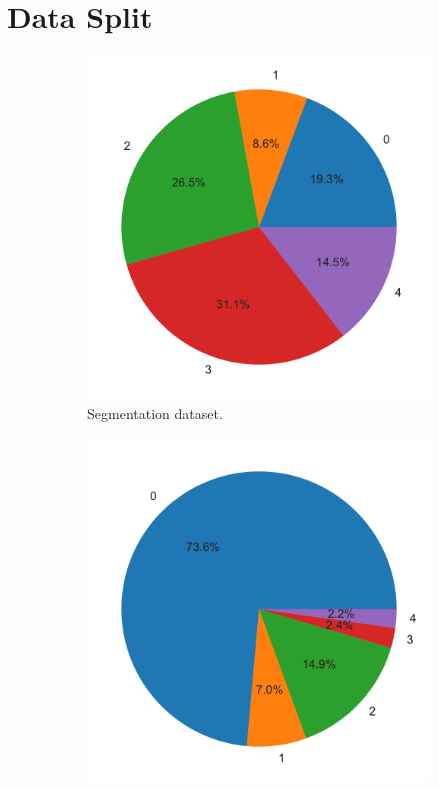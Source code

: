 \section{Data Split}

\begin{figure}[h]
    \centering
    \begin{subfigure}{0.3\textwidth}
        \centering
        \includegraphics[width=\textwidth]{datasets/figs/combined_grade_dist.pdf}
        \caption{Segmentation dataset.}
        \label{fig:segmentation_grade_dist}
    \end{subfigure}
    \begin{subfigure}{0.3\textwidth}
        \centering
        \includegraphics[width=\textwidth]{datasets/figs/eyepacs_grade_dist.pdf}

\end{subfigure}
\end{figure}

